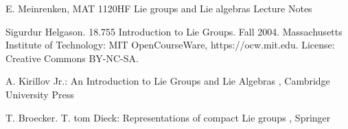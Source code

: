 \documentclass{article}
\theoremstyle{remark}
\newtheorem{exercise}[theorem]{Exercise}
\begin{document}





\newpage
\begin{thebibliography}{}
\bibitem[]{}
E. Meinrenken, MAT 1120HF Lie groups and Lie algebras Lecture Notes

\bibitem[]{}
Sigurdur Helgason. 18.755 Introduction to Lie Groups. Fall 2004. Massachusetts Institute of Technology: MIT OpenCourseWare, https://ocw.mit.edu. License: Creative Commons BY-NC-SA.


\bibitem[]{}
A. Kirillov Jr.: An Introduction to Lie Groups and Lie Algebras , Cambridge University Press

\bibitem[]{}
T. Broecker. T. tom Dieck: Representations of compact Lie groups , Springer


\end{thebibliography}
\end{document}
